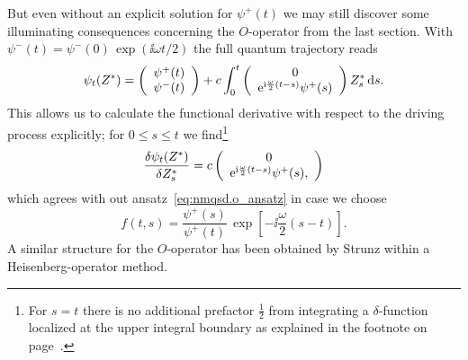 But even without an explicit solution for $\psi^+(t)$ we may still discover some illuminating consequences concerning the $O$-operator from the last section.
With $\psi^-(t) = \psi^-(0) \, \exp(\ii \omega t / 2)$ the full quantum trajectory reads
\begin{equation}
  \psi_t(\ZZ) = \left(\begin{array}{c}
    \psi^+(t) \\ \psi^-(t)
    \end{array}\right)
  + c \int_0^t \left(\begin{array}{c}
    0 \\ \exp[\ii \frac{\omega}{2} (t-s)] \psi^+(s)
    \end{array}\right)
  \ZZ_s \dd s.
  \label{eq:nmqsd.solution}
\end{equation}
This allows us to calculate the functional derivative with respect to the driving process explicitly;
for $0 \le s \le t$ we find\footnote{For $s = t$ there is no additional prefactor $\frac{1}{2}$ from integrating a $\delta$-function localized at the upper integral boundary as explained in the footnote on page~\pageref{fn:tla.boundaries}.}
\begin{equation*}
  \frac{\delta \psi_t(\ZZ)}{\delta \ZZ_s} = c \left(\begin{array}{c}
    0 \\ \exp[\ii \frac{\omega}{2}(t - s)] \psi^+(s),
    \end{array}\right)
\end{equation*}
which agrees with out ansatz~\ref{eq:nmqsd.o_ansatz} in case we choose
\begin{equation}
  f(t, s) = \frac{\psi^+(s)}{\psi^+(t)} \, \exp[-\ii \frac{\omega}{2}(s - t)].
  \label{eq:nmqsd.o_ansatz_psi}
\end{equation}
A similar structure for the $O$-operator has been obtained by Strunz \cite{St01_habil} within a Heisenberg-operator method.


